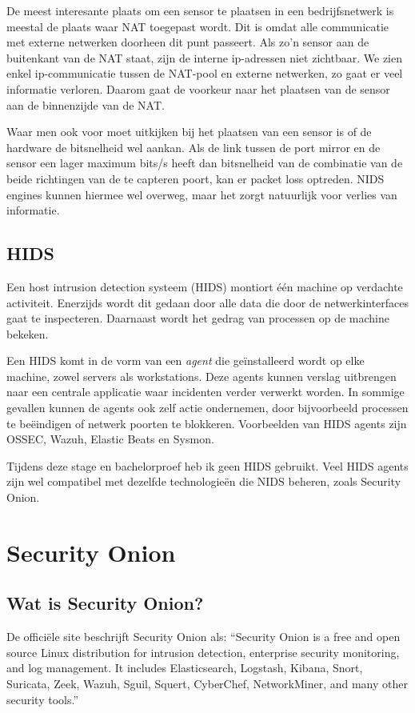 \documentclass[a4paper,12pt]{report}
\begin{document}
De meest interesante plaats om een sensor te plaatsen in een bedrijfsnetwerk is meestal de plaats waar NAT toegepast wordt.
Dit is omdat alle communicatie met externe netwerken doorheen dit punt passeert.
Als zo'n sensor aan de buitenkant van de NAT staat, zijn de interne ip-adressen niet zichtbaar.
We zien enkel ip-communicatie tussen de NAT-pool en externe netwerken, zo gaat er veel informatie verloren.
Daarom gaat de voorkeur naar het plaatsen van de sensor aan de binnenzijde van de NAT.

Waar men ook voor moet uitkijken bij het plaatsen van een sensor is of de hardware de bitsnelheid wel aankan.
Als de link tussen de port mirror en de sensor een lager maximum bits/s heeft dan bitsnelheid van de combinatie van de beide richtingen van de te capteren poort, kan er packet loss optreden.
NIDS engines kunnen hiermee wel overweg, maar het zorgt natuurlijk voor verlies van informatie.

\section{HIDS}
Een host intrusion detection systeem (HIDS) montiort één machine op verdachte activiteit.
Enerzijds wordt dit gedaan door alle data die door de netwerkinterfaces gaat te inspecteren.
Daarnaast wordt het gedrag van processen op de machine bekeken.
\autocite{wikipedia:hids}

Een HIDS komt in de vorm van een \emph{agent} die geïnstalleerd wordt op elke machine, zowel servers als workstations.
Deze agents kunnen verslag uitbrengen naar een centrale applicatie waar incidenten verder verwerkt worden.
In sommige gevallen kunnen de agents ook zelf actie ondernemen, door bijvoorbeeld processen te beëindigen of netwerk poorten te blokkeren.
Voorbeelden van HIDS agents zijn OSSEC, Wazuh, Elastic Beats en Sysmon.

Tijdens deze stage en bachelorproef heb ik geen HIDS gebruikt.
Veel HIDS agents zijn wel compatibel met dezelfde technologieën die NIDS beheren, zoals Security Onion.

\chapter{Security Onion}
\section{Wat is Security Onion?}
De officiële site beschrijft Security Onion als:
``Security Onion is a free and open source Linux distribution for intrusion detection, enterprise security monitoring, and log management.
It includes Elasticsearch, Logstash, Kibana, Snort, Suricata, Zeek, Wazuh, Sguil, Squert, CyberChef, NetworkMiner, and many other security tools.''
\autocite{so:docs}
\end{document}
